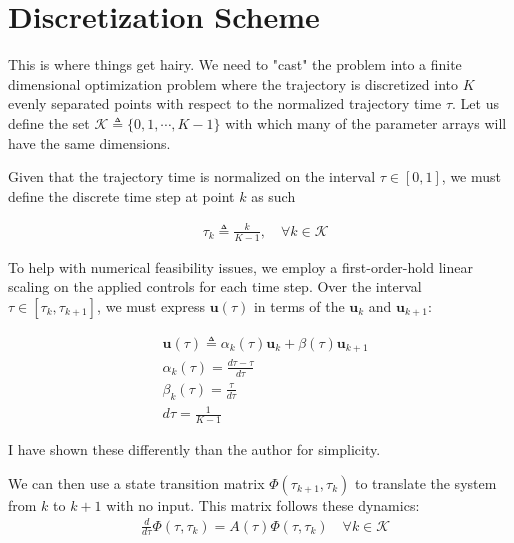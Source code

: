 \section{Discretization Scheme}
This is where things get hairy. We need to "cast" the problem into a finite dimensional optimization problem where the trajectory is discretized into $K$ evenly separated points with respect to the normalized trajectory time $\tau$. Let us define the set $\mathcal{K}\triangleq \{0,1,\cdots, K-1\}$ with which many of the parameter arrays will have the same dimensions.

Given that the trajectory time is normalized on the interval $\tau \in [0,1 ]$, we must define the discrete time step at point $k$ as such

\begin{align}
& \tau_k \triangleq \frac{k}{K-1}, \quad \forall k \in \mathcal{K}
\end{align}

To help with numerical feasibility issues, we employ a first-order-hold linear scaling on the applied controls for each time step. Over the interval $\tau \in [\tau_k, \tau_{k+1}]$, we must express $\mathbf{u}(\tau)$ in terms of the $\mathbf{u}_k$
 and $\mathbf{u}_{k+1}$:

 \begin{align}
& \mathbf{u}(\tau) \triangleq \alpha_k(\tau) \mathbf{u}_k + \beta(\tau) \mathbf{u}_{k+1} \\ 
& \alpha_k(\tau) = \frac{d\tau - \tau}{d\tau} \\
& \beta_k(\tau) = \frac{\tau}{d\tau} \\
& d\tau = \frac{1}{K-1}
\end{align}

I have shown these differently than the author for simplicity.

We can then use a state transition matrix $\Phi(\tau_{k+1},\tau_k)$ to translate the system from $k$ to $k+1$ with no input. This matrix follows these dynamics:
\begin{align}
& \frac{d}{d\tau} \Phi(\tau,\tau_k) = A(\tau) \Phi(\tau,\tau_k) \quad \forall k \in \mathcal{K}
\end{align}

